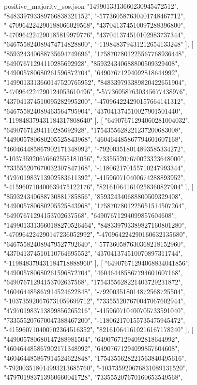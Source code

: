 \begin{filecontents*}[overwrite]{positive_majority_sos.json}
    "1499013313660230945472512",
    "848339793389766838321152",
    "-577360587630401748467712",
    "-470964224290188066029568",
    "437041374510097288396800",
    "-470964224290185819979776",
    "437041374510102983737344",
    "646755824089474714828800",
    "-119848379431212654133248"
   ],
   [
    "859324340688735694749696",
    "1758707801225567768936448",
    "64907671294110285692928",
    "859324340688800509329408",
    "449005780680261596872704",
    "64907671294092818644992",
    "1499013313660147520765952",
    "848339793389820422651904",
    "-470964224290124053610496",
    "-577360587630345677438976",
    "437041374510095282995200",
    "-470964224290157664141312",
    "646755824089463564795904",
    "437041374510027901501440",
    "-119848379431184317808640"
   ],
   [
    "64907671294060281004032",
    "64907671294110285692928",
    "1754355628221237200683008",
    "449005780680205525843968",
    "460464485867794601607168",
    "460464485867902171348992",
    "-792003518014893585334272",
    "-103735920676662555181056",
    "733555207670023323648000",
    "733555207670032307847168",
    "-118062170155710247993344",
    "479701983713902583611392",
    "-415960710400674288893952",
    "-415960710400639475122176",
    "821610641610258360827904"
   ],
   [
    "859324340688730881785856",
    "859324340688800509329408",
    "449005780680205525843968",
    "1758707801225651514507264",
    "64907671294153702637568",
    "64907671294099857604608",
    "1499013313660188270526464",
    "848339793389827160801280",
    "-470964224290147236052992",
    "-470964224290160632135680",
    "646755824089479527792640",
    "-577360587630368218152960",
    "437041374510110764695552",
    "437041374510070897311744",
    "-119848379431184718888960"
   ],
   [
    "64907671294068834041856",
    "449005780680261596872704",
    "460464485867794601607168",
    "64907671294153702637568",
    "1754355628221403729231872",
    "460464485867914524622848",
    "-792003518014872568725504",
    "-103735920676731059699712",
    "733555207670047067602944",
    "479701983713899856265216",
    "-415960710400705733591040",
    "733555207670047388467200",
    "-118062170155735475945472",
    "-415960710400702364516352",
    "821610641610216167178240"
   ],
   [
    "449005780680147288981504",
    "64907671294092818644992",
    "460464485867902171348992",
    "64907671294099857604608",
    "460464485867914524622848",
    "1754355628221563840495616",
    "-792003518014993213685760",
    "-103735920676831089131520",
    "479701983713960660041728",
    "733555207670160653549568",

\end{filecontents*}
